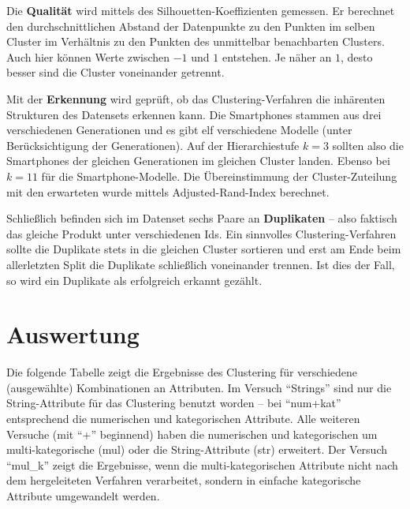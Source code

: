 Die \textbf{Qualität} wird mittels des Silhouetten-Koeffizienten
\autocite{rousseeuw1987} gemessen. Er berechnet den durchschnittlichen
Abstand der Datenpunkte zu den Punkten im selben Cluster im Verhältnis
zu den Punkten des unmittelbar benachbarten Clusters. Auch hier können
Werte zwischen \(-1\) und \(1\) entstehen. Je näher an \(1\), desto
besser sind die Cluster voneinander getrennt.

Mit der \textbf{Erkennung} wird geprüft, ob das Clustering-Verfahren die
inhärenten Strukturen des Datensets erkennen kann. Die Smartphones
stammen aus drei verschiedenen Generationen und es gibt elf verschiedene
Modelle (unter Berücksichtigung der Generationen). Auf der
Hierarchiestufe \(k=3\) sollten also die Smartphones der gleichen
Generationen im gleichen Cluster landen. Ebenso bei \(k=11\) für die
Smartphone-Modelle. Die Übereinstimmung der Cluster-Zuteilung mit den
erwarteten wurde mittels Adjusted-Rand-Index berechnet.

Schließlich befinden sich im Datenset sechs Paare an \textbf{Duplikaten}
-- also faktisch das gleiche Produkt unter verschiedenen Ids. Ein
sinnvolles Clustering-Verfahren sollte die Duplikate stets in die
gleichen Cluster sortieren und erst am Ende beim allerletzten Split die
Duplikate schließlich voneinander trennen. Ist dies der Fall, so wird
ein Duplikate als erfolgreich erkannt gezählt.

\hypertarget{auswertung}{%
\section{Auswertung}\label{auswertung}}

Die folgende Tabelle zeigt die Ergebnisse des Clustering für
verschiedene (ausgewählte) Kombinationen an Attributen. Im Versuch
``Strings'' sind nur die String-Attribute für das Clustering benutzt
worden -- bei ``num+kat'' entsprechend die numerischen und kategorischen
Attribute. Alle weiteren Versuche (mit ``+'' beginnend) haben die
numerischen und kategorischen um multi-kategorische (mul) oder die
String-Attribute (str) erweitert. Der Versuch ``mul\_k'' zeigt die
Ergebnisse, wenn die multi-kategorischen Attribute nicht nach dem
hergeleiteten Verfahren verarbeitet, sondern in einfache kategorische
Attribute umgewandelt werden.

